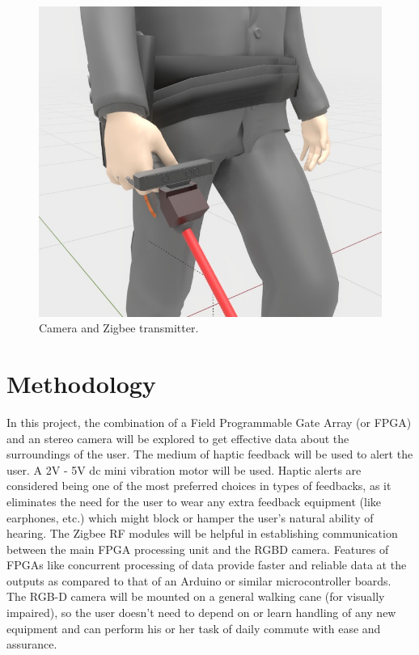 \documentclass[conference]{IEEEtran}
\begin{document}
\begin{figure}[htbp]
\centerline{\includegraphics[scale=0.25]{blender-camera.jpeg}}
\caption{Camera and Zigbee transmitter.}
\label{fig}
\end{figure}

\section{Methodology}\label{SCM}
In this project, the combination of a Field Programmable Gate Array (or FPGA) and an stereo camera will be explored to get effective data about the surroundings of the user. The medium of haptic feedback will be used to alert the user. A 2V - 5V dc mini vibration motor will be used. Haptic alerts are considered being one of the most preferred choices in types of feedbacks, as it eliminates the need for the user to wear any extra feedback equipment (like earphones, etc.) which might block or hamper the user’s natural ability of hearing. The Zigbee RF modules will be helpful in establishing communication between the main FPGA processing unit and the RGBD camera. Features of FPGAs like concurrent processing of data provide faster and reliable data at the outputs as compared to that of an Arduino or similar microcontroller boards. The RGB-D camera will be mounted on a general walking cane (for visually impaired), so the user doesn’t need to depend on or learn handling of any new equipment and can perform his or her task of daily commute with ease and assurance.
\end{document}
